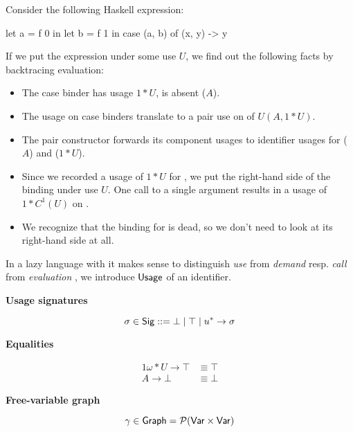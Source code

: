 \begin{example} 
Consider the following Haskell expression:

\begin{haskellcode}
let a = f 0 
in let b = f 1 
   in case (a, b) of
        (x, y) -> y
\end{haskellcode}

If we put the expression under some use $U$, we find out the following facts by backtracing evaluation:

\begin{itemize}
\item The case binder  has usage $1*U$,  is absent ($A$).
\item The usage on case binders translate to a pair use on  of $U(A,1*U)$.
\item The pair constructor forwards its component usages to identifier usages for  ($A$) and  ($1*U$).
\item Since we recorded a usage of $1*U$ for , we put the right-hand side of the binding under use $U$. 
      One call to a single argument results in a usage of $1*C^1(U)$ on .
\item We recognize that the binding for  is dead, so we don't need to look at its right-hand side at all.
\end{itemize}
\end{example}

In a lazy language with  it makes sense to distinguish \emph{use} from \emph{demand} \parencite[Appendix~C.2]{warnsbrough} resp. \emph{call} from \emph{evaluation} \parencite[Section~2.5]{card}, we introduce $\text{\textsf{Usage}}$ of an identifier.




\textbf{Usage signatures}

\[
\sigma \in \text{\textsf{Sig}} ::= \bot \mid \top \mid u^* \to \sigma
\]

\textbf{Equalities}

\begin{alignat*}{1}
\omega*U \to \top &\equiv \top \\
A \to \bot &\equiv \bot
\end{alignat*}

\textbf{Free-variable graph}

\[
\gamma \in \text{\textsf{Graph}} = \mathcal{P}(\text{\textsf{Var}} \times \text{\textsf{Var}})
\]

